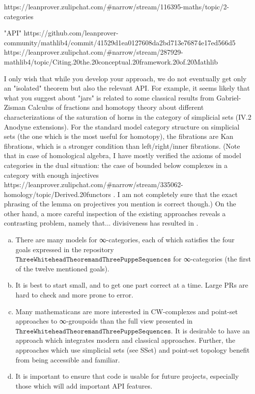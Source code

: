 \documentclass{book}
\begin{document}
https://leanprover.zulipchat.com/#narrow/stream/116395-maths/topic/2-categories

"API"
https://github.com/leanprover-community/mathlib4/commit/41529d1ea0127608da2bd713e76874e17ed566d5
https://leanprover.zulipchat.com/#narrow/stream/287929-mathlib4/topic/Citing.20the.20conceptual.20framework.20of.20Mathlib

I only wish that while you develop your approach, we do not eventually get only an "isolated" theorem but also the relevant API. For example, it seems likely that what you suggest about "jars" is related to some classical results from Gabriel-Zisman Calculus of fractions and homotopy theory about different characterizations of the saturation of horns in the category of simplicial sets (IV.2 Anodyne extensions).
For the standard model category structure on simplicial sets (the one which is the most useful for homotopy), the fibrations are Kan fibrations, which is a stronger condition than left/right/inner fibrations.
(Note that in case of homological algebra, I have mostly verified the axioms of model categories in the dual situation: the case of bounded below complexes in a category with enough injectives https://leanprover.zulipchat.com/#narrow/stream/335062-homology/topic/Derived.20functors . I am not completely sure that the exact phrasing of the lemma on projectives you mention is correct though.)
On the other hand, a more careful inspection of the existing approaches reveals a contrasting problem, namely that... divisiveness has resulted in .

\begin{enumerate}[(a)]
    \item There are many models for ∞-categories, each of which satisfies the four goals expressed in the repository $\texttt{ThreeWhiteheadTheoremandThreePuppeSequences}$ for ∞-categories (the first of the twelve mentioned goals). 
    \item It is best to start small, and to get one part correct at a time. Large PRs are hard to check and more prone to error.
    \item Many mathematicans are more interested in CW-complexes and point-set approaches to ∞-groupoids than the full view presented in $\texttt{ThreeWhiteheadTheoremandThreePuppeSequences}$. It is desirable to have an approach which integrates modern and classical approaches. Further, the approaches which use simplicial sets (see SSet) and point-set topology benefit from being accessible and familiar.
    \item It is important to ensure that code is usable for future projects, especially those which will add important API features.
    \end{enumerate}
\end{document}
